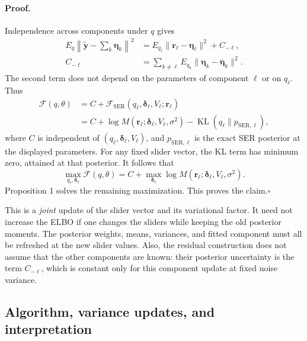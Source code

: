 \documentclass[11pt]{article}
\begin{document}
\paragraph{Proof.}
Independence across components under $q$ gives
\begin{align}
E_q\left\|\widetilde{\mathbf y}
          -\sum_k\boldsymbol\eta_k\right\|^2
 &=E_{q_\ell}\|\mathbf r_\ell-\boldsymbol\eta_\ell\|^2
   +C_{-\ell},\nonumber\\
C_{-\ell}
 &=\sum_{k\neq\ell}
   E_{q_k}\|\boldsymbol\eta_k
                 -\overline{\boldsymbol\eta}_k\|^2.
\label{eq:veb-residual-decomposition}
\end{align}
The second term does not depend on the parameters of component
$\ell$ or on $q_\ell$. Thus
\begin{align}
\mathcal F(q,\theta)
 &=C+\mathcal F_{\mathrm{SER}}
       (q_\ell,\boldsymbol\delta_\ell,V_\ell;\mathbf r_\ell)
\label{eq:veb-block-identity}\\
 &=C+\log M(\mathbf r_\ell;
           \boldsymbol\delta_\ell,V_\ell,\sigma^2)
   -\operatorname{KL}(q_\ell\|p_{\mathrm{SER},\ell}),
\label{eq:veb-block-kl}
\end{align}
where $C$ is independent of $(q_\ell,\boldsymbol\delta_\ell,V_\ell)$,
and $p_{\mathrm{SER},\ell}$ is the exact SER posterior at the
displayed parameters. For any fixed slider vector, the KL term
has minimum zero, attained at that posterior. It follows that
\begin{equation}
\max_{q_\ell,\boldsymbol\delta_\ell}\mathcal F(q,\theta)
 =C+\max_{\boldsymbol\delta_\ell}
       \log M(\mathbf r_\ell;
                \boldsymbol\delta_\ell,V_\ell,\sigma^2).
\label{eq:veb-profiled-block}
\end{equation}
Proposition 1 solves the remaining maximization. This proves the
claim.\hfill$\square$

This is a \emph{joint} update of the slider vector and its
variational factor. It need not increase the ELBO if one changes
the sliders while keeping the old posterior moments. The posterior
weights, means, variances, and fitted component must all be refreshed
at the new slider values. Also, the residual construction does not
assume that the other components are known: their posterior
uncertainty is the term $C_{-\ell}$, which is constant only for this
component update at fixed noise variance.

\subsection{Algorithm, variance updates, and interpretation}
\end{document}
